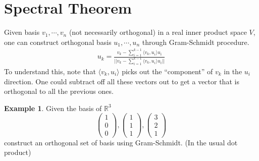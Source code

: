 \documentclass[12pt, a4paper]{article}
\newcommand{\R}{\mathbb{R}}
\newcommand{\inner}[1]{\langle #1 \rangle}
\newcommand{\norm}[1]{\lvert \lvert #1 \rvert \rvert}
\theoremstyle{remark}
\theoremstyle{definition}
\newtheorem{example}{Example}
\numberwithin{equation}{section}
\numberwithin{definition}{section}
\numberwithin{example}{section}
\numberwithin{exercise}{section}
\numberwithin{remark}{section}
\numberwithin{figure}{section}
\begin{document}
\section{Spectral Theorem}
Given basis $v_1, \cdots, v_n$ (not necessarily orthogonal) in a real inner product space $V$,
one can construct orthogonal basis $u_1, \cdots, u_n$ through Gram-Schmidt procedure.
\begin{align*}
    u_k = \frac{v_k - \sum_{i=1}^{k-1} \inner{v_k, u_i}u_i}{\norm{v_k - \sum_{i=1}^{k-1} \inner{v_k, u_i}u_i}}
\end{align*}
To understand this, note that $\inner{v_k, u_i}$ picks out the ``component'' of $v_k$ in the $u_i$ direction.
One could subtract off all these vectors out to get a vector that is orthogonal to all the previous ones.
\begin{example}
    Given the basis of $\R^3$
    \begin{equation*}
        \begin{pmatrix}
            1 \\ 0 \\ 0
        \end{pmatrix},
        \begin{pmatrix}
            1 \\ 1 \\ 1
        \end{pmatrix},
        \begin{pmatrix}
            3 \\ 2 \\ 1
        \end{pmatrix}
    \end{equation*}
    construct an orthogonal set of basis using Gram-Schmidt. (In the usual dot product)
\end{example}
\end{document}

